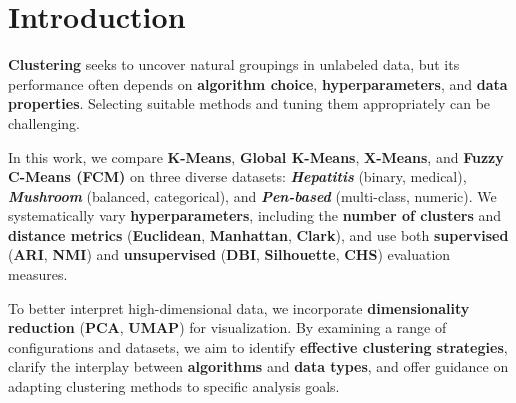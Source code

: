 \section{Introduction}
\textbf{Clustering} seeks to uncover natural groupings in unlabeled data, but its performance often depends on \textbf{algorithm choice}, \textbf{hyperparameters}, and \textbf{data properties}. Selecting suitable methods and tuning them appropriately can be challenging.

In this work, we compare \textbf{K-Means}, \textbf{Global K-Means}, \textbf{X-Means}, and \textbf{Fuzzy C-Means (FCM)} on three diverse datasets: \textit{\textbf{Hepatitis}} (binary, medical), \textit{\textbf{Mushroom}} (balanced, categorical), and \textit{\textbf{Pen-based}} (multi-class, numeric). We systematically vary \textbf{hyperparameters}, including the \textbf{number of clusters} and \textbf{distance metrics} (\textbf{Euclidean}, \textbf{Manhattan}, \textbf{Clark}), and use both \textbf{supervised} (\textbf{ARI}, \textbf{NMI}) and \textbf{unsupervised} (\textbf{DBI}, \textbf{Silhouette}, \textbf{CHS}) evaluation measures.

To better interpret high-dimensional data, we incorporate \textbf{dimensionality reduction} (\textbf{PCA}, \textbf{UMAP}) for visualization. By examining a range of configurations and datasets, we aim to identify \textbf{effective clustering strategies}, clarify the interplay between \textbf{algorithms} and \textbf{data types}, and offer guidance on adapting clustering methods to specific analysis goals.